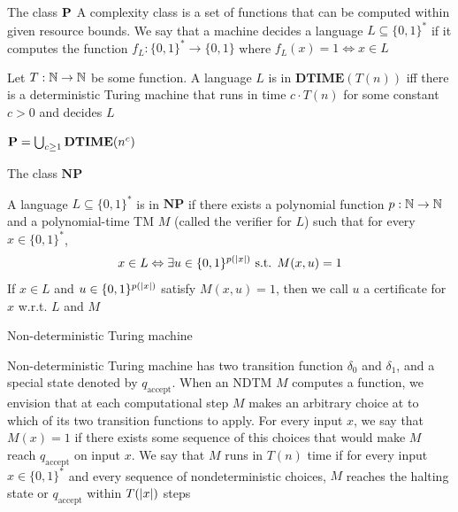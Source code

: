 \documentclass[presentation]{beamer}
\def \NP {\textbf{NP}}
\def \DTIME {\textbf{DTIME}}
\def \NP {\textbf{NP}}
\def \accept {\text{accept}}
\begin{document}
\begin{frame}[label={sec:org75a3af5}]{The class \texorpdfstring{\(\operatorname{\textbf{P}}\)}{P}}
A \alert{complexity class} is a set of functions that can be computed within given resource bounds. We
say that a machine \alert{decides} a language \(L\subseteq\{0,1\}^*\) if it computes the
function \(f_L:\{0,1\}^*\to\{0,1\}\) where \(f_L(x)=1\Leftrightarrow x\in L\)

\begin{definition}[]
Let \(T:\mathbb{N}\to\mathbb{N}\) be some function. A language \(L\) is in \(\DTIME(T(n))\) iff there is a
deterministic Turing machine that runs in time \(c\cdot T(n)\) for some constant \(c>0\) and decides \(L\)
\end{definition}

\begin{definition}[]
\(\bP=\bigcup_{c\ge 1}\DTIME(n^c)\)
\end{definition}
\end{frame}
\begin{frame}[label={sec:org5c50345}]{The class \texorpdfstring{\(\NP\)}{NP}}
\begin{definition}[]
A language \(L\subseteq\{0,1\}^*\) is in \(\NP\) if there exists a polynomial function \(p:\mathbb{N}\to\mathbb{N}\) and a
polynomial-time TM \(M\) (called the \alert{verifier} for \(L\)) such that for every \(x\in\{0,1\}^*\),
\begin{equation*}
x\in L\Leftrightarrow\exists u\in\{0,1\}^{p(\abs{x})} \text{ s.t. } M(x,u)=1
\end{equation*}
If \(x\in L\) and \(u\in\{0,1\}^{p(\abs{x})}\) satisfy \(M(x,u)=1\), then we call \(u\) a \alert{certificate}
for \(x\) w.r.t. \(L\) and \(M\)
\end{definition}
\end{frame}
\begin{frame}[label={sec:org65a8a6d}]{Non-deterministic Turing machine}
\begin{definition}[]
\alert{Non-deterministic Turing machine} has \alert{two} transition function \(\delta_0\) and \(\delta_1\), and a special state denoted
by \(q_{\accept}\). When an NDTM \(M\) computes a function, we envision that at each
computational step \(M\) makes an arbitrary choice at to which of its two transition functions
to apply. For every input \(x\), we say that \(M(x)=1\) if there \alert{exists} some sequence of this
choices that would make \(M\) reach \(q_{\accept}\) on input \(x\). We say that \(M\) runs
in \(T(n)\) time if for every input \(x\in\{0,1\}^*\) and every sequence of nondeterministic
choices, \(M\) reaches the halting state or \(q_{\accept}\) within \(T(\abs{x})\) steps
\end{definition}
\end{frame}
\end{document}
